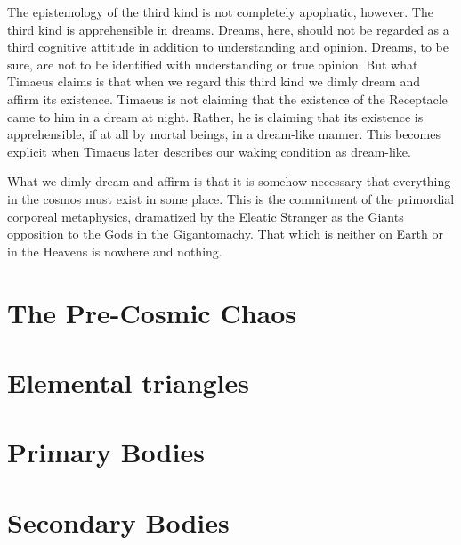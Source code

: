 The epistemology of the third kind is not completely apophatic, however. The third kind is apprehensible in dreams. Dreams, here, should not be regarded as a third cognitive attitude in addition to understanding and opinion. Dreams, to be sure, are not to be identified with understanding or true opinion. But what Timaeus claims is that when we regard this third kind we dimly dream and affirm its existence. Timaeus is not claiming that the existence of the Receptacle came to him in a dream at night. Rather, he is claiming that its existence is apprehensible, if at all by mortal beings, in a dream-like manner. This becomes explicit when Timaeus later describes our waking condition as dream-like.

What we dimly dream and affirm is that it is somehow necessary that everything in the cosmos must exist in some place. This is the commitment of the primordial corporeal metaphysics, dramatized by the Eleatic Stranger as the Giants opposition to the Gods in the Gigantomachy. That which is neither on Earth or in the Heavens is nowhere and nothing.

\section{The Pre-Cosmic Chaos} %
\label{sec:the_pre_cosmic_chaos}



\section{Elemental triangles} %
\label{sec:elemental_triangles}




\section{Primary Bodies} %
\label{sec:primary_bodies}




\section{Secondary Bodies} %
\label{sec:secondary_bodies}





